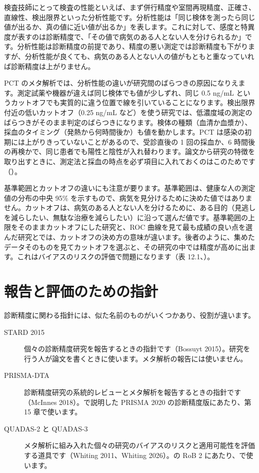 検査技師にとって検査の性能といえば、まず併行精度や室間再現精度、正確さ、直線性、検出限界といった分析性能です。分析性能は「同じ検体を測ったら同じ値が出るか、真の値に近い値が出るか」を表します。これに対して、感度と特異度が表すのは診断精度で、「その値で病気のある人とない人を分けられるか」です。分析性能は診断精度の前提であり、精度の悪い測定では診断精度も下がりますが、分析性能が良くても、病気のある人とない人の値がもともと重なっていれば診断精度は上がりません。

PCT のメタ解析では、分析性能の違いが研究間のばらつきの原因になりえます。測定試薬や機器が違えば同じ検体でも値が少しずれ、同じ 0.5 ng/mL というカットオフでも実質的に違う位置で線を引いていることになります。検出限界付近の低いカットオフ（0.25 ng/mL など）を使う研究では、低濃度域の測定のばらつきがそのまま判定のばらつきになります。検体の種類（血清か血漿か）、採血のタイミング（発熱から何時間後か）も値を動かします。PCT は感染の初期には上がりきっていないことがあるので、受診直後の 1 回の採血か、6 時間後の再検かで、同じ患者でも陽性と陰性が入れ替わります。論文から研究の特徴を取り出すときに、測定法と採血の時点を必ず項目に入れておくのはこのためです（）。

基準範囲とカットオフの違いにも注意が要ります。基準範囲は、健康な人の測定値の分布の中央 95\% を示すもので、病気を見分けるために決めた値ではありません。カットオフは、病気のある人とない人を分けるために、ある目的（見逃しを減らしたい、無駄な治療を減らしたい）に沿って選んだ値です。基準範囲の上限をそのままカットオフにした研究と、ROC 曲線を見て最も成績の良い点を選んだ研究とでは、カットオフの決め方の意味が違います。後者のように、集めたデータそのものを見てカットオフを選ぶと、その研究の中では精度が高めに出ます。これはバイアスのリスクの評価で問題になります（表 12.1、）。

\section{報告と評価のための指針}
\label{sec:09-7}

診断精度に関わる指針には、似た名前のものがいくつかあり、役割が違います。
\begin{description}
\item[STARD 2015] 個々の診断精度研究を報告するときの指針です（Bossuyt 2015）。研究を行う人が論文を書くときに使います。メタ解析の報告には使いません。
\item[PRISMA-DTA] 診断精度研究の系統的レビューとメタ解析を報告するときの指針です（McInnes 2018）。で説明した PRISMA 2020 の診断精度版にあたり、第 15 章で使います。
\item[QUADAS-2 と QUADAS-3] メタ解析に組み入れた個々の研究のバイアスのリスクと適用可能性を評価する道具です（Whiting 2011、Whiting 2026）。の RoB 2 にあたり、で使います。
\end{description}

